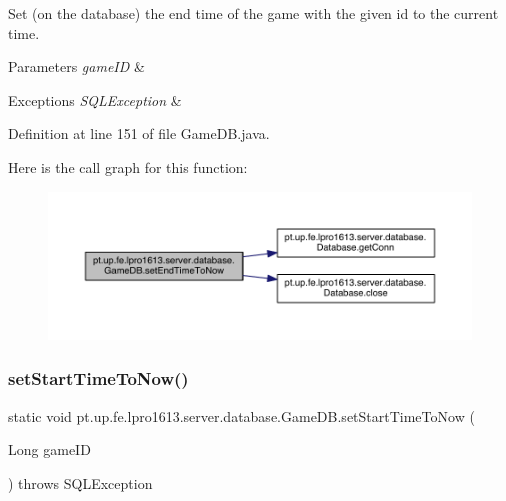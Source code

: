 Set (on the database) the end time of the game with the given id to the current time.


\begin{DoxyParams}{Parameters}
{\em game\+ID} & \\
\hline
\end{DoxyParams}

\begin{DoxyExceptions}{Exceptions}
{\em S\+Q\+L\+Exception} & \\
\hline
\end{DoxyExceptions}


Definition at line 151 of file Game\+D\+B.\+java.

Here is the call graph for this function\+:
\nopagebreak
\begin{figure}[H]
\begin{center}
\leavevmode
\includegraphics[width=350pt]{classpt_1_1up_1_1fe_1_1lpro1613_1_1server_1_1database_1_1_game_d_b_ab352e7cd06250b77274f5c4f261f8116_cgraph}
\end{center}
\end{figure}
\hypertarget{classpt_1_1up_1_1fe_1_1lpro1613_1_1server_1_1database_1_1_game_d_b_a991c06b53598f46f4eea30c8c8fc31f7}{}\label{classpt_1_1up_1_1fe_1_1lpro1613_1_1server_1_1database_1_1_game_d_b_a991c06b53598f46f4eea30c8c8fc31f7} 
\subsubsection{\texorpdfstring{set\+Start\+Time\+To\+Now()}{setStartTimeToNow()}}
{\footnotesize\ttfamily static void pt.\+up.\+fe.\+lpro1613.\+server.\+database.\+Game\+D\+B.\+set\+Start\+Time\+To\+Now (\begin{DoxyParamCaption}\item[{Long}]{game\+ID }\end{DoxyParamCaption}) throws S\+Q\+L\+Exception\hspace{0.3cm}{\ttfamily [static]}}

